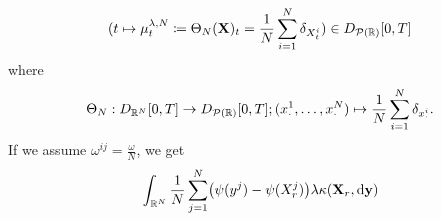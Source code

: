 \begin{equation}
  \lparen t \mapsto \mu_t^{\lambda, N} \coloneqq \Theta_N(\mathbf{X})_t = \frac{1}{N} \sum_{i=1}^N \delta_{X_t^i} \rparen \in D_{\mathcal{P}(\mathbb{R})}[0,T]
\end{equation}
where
\begin{equation}
  \Theta_N : D_{\mathbb{R}^N}[0,T] \to D_{\mathcal{P}(\mathbb{R})}[0,T]; (x_\cdot^1,\dots,x_\cdot^N) \mapsto \frac{1}{N} \sum_{i=1}^N \delta_{x_\cdot^i}.
\end{equation}
If we assume $\omega^{ij} = \frac{\omega}{N}$, we get
\begin{equation}\label{eq:kappa-to-mean-kappa}
  \begin{split}
     & \int_{\potspace^N} \frac{1}{N} \sum_{j=1}^N \br*{ \psi(y^j) - \psi(X_{r}^j) } \lambda \kappa(\bm{X}_r, \odif{\bm{y}})                                                                  \\

\end{split}
\end{equation}
